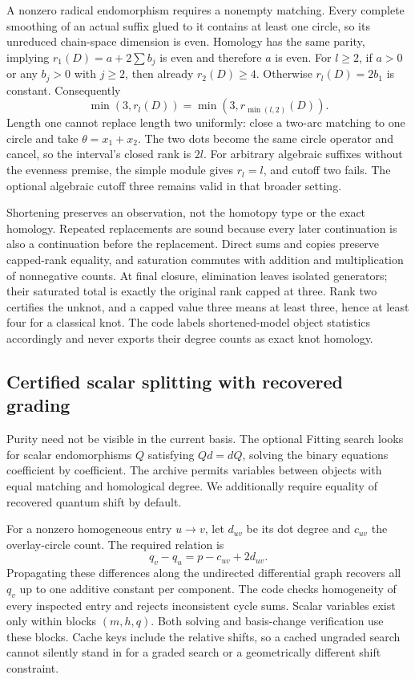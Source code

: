 A nonzero radical endomorphism requires a nonempty matching. Every complete
smoothing of an actual suffix glued to it contains at least one circle,
so its unreduced chain-space dimension is even. Homology has the same
parity, implying $r_1(D)=a+2\sum b_j$ is even and therefore $a$ is even.
For $l\ge2$, if $a>0$ or any $b_j>0$ with $j\ge2$, then already
$r_2(D)\ge4$. Otherwise $r_l(D)=2b_1$ is constant. Consequently
\begin{equation}\label{eq:integrated-cap-two}
 \min(3,r_l(D))=\min(3,r_{\min(l,2)}(D)).
\end{equation}
Length one cannot replace length two uniformly: close a two-arc matching
to one circle and take $\theta=x_1+x_2$. The two dots become the same
circle operator and cancel, so the interval's closed rank is $2l$.
For arbitrary algebraic suffixes without the evenness premise, the simple
module gives $r_l=l$, and cutoff two fails. The optional algebraic cutoff
three remains valid in that broader setting.

Shortening preserves an observation, not the homotopy type or the exact
homology. Repeated replacements are sound because every later continuation
is also a continuation before the replacement. Direct sums and copies
preserve capped-rank equality, and saturation commutes with addition and
multiplication of nonnegative counts. At final closure, elimination leaves
isolated generators; their saturated total is exactly the original rank
capped at three. Rank two certifies the unknot, and a capped value three
means at least three, hence at least four for a classical knot.
The code labels shortened-model object statistics accordingly and never
exports their degree counts as exact knot homology.

\subsection{Certified scalar splitting with recovered grading}
Purity need not be visible in the current basis. The optional Fitting
search looks for scalar endomorphisms $Q$ satisfying $Qd=dQ$, solving the
binary equations coefficient by coefficient. The archive permits variables
between objects with equal matching and homological degree. We additionally
require equality of recovered quantum shift by default.

For a nonzero homogeneous entry $u\to v$, let $d_{uv}$ be its dot degree
and $c_{uv}$ the overlay-circle count. The required relation is
\[
 q_v-q_u=p-c_{uv}+2d_{uv}.
\]
Propagating these differences along the undirected differential graph
recovers all $q_v$ up to one additive constant per component. The code
checks homogeneity of every inspected entry and rejects inconsistent cycle
sums. Scalar variables exist only within blocks $(m,h,q)$. Both solving
and basis-change verification use these blocks. Cache keys include the
relative shifts, so a cached ungraded search cannot silently stand in for
a graded search or a geometrically different shift constraint.

